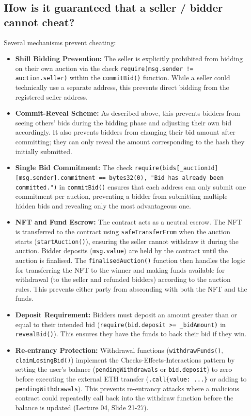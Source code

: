 \documentclass[11pt, a4paper]{article}
\begin{document}
\subsection{How is it guaranteed that a seller / bidder cannot cheat?}
Several mechanisms prevent cheating:
\begin{itemize}
    \item \textbf{Shill Bidding Prevention:} The seller is explicitly prohibited from bidding on their own auction via the check \texttt{require(msg.sender != auction.seller)} within the \texttt{commitBid()} function. While a seller could technically use a separate address, this prevents direct bidding from the registered seller address.
    \item \textbf{Commit-Reveal Scheme:} As described above, this prevents bidders from seeing others' bids during the bidding phase and adjusting their own bid accordingly. It also prevents bidders from changing their bid amount after committing; they can only reveal the amount corresponding to the hash they initially submitted.
    \item \textbf{Single Bid Commitment:} The check \texttt{require(bids[\_auctionId][msg.sender]\newline.commitment == bytes32(0), "Bid has already been committed.")} in \texttt{commitBid()} ensures that each address can only submit one commitment per auction, preventing a bidder from submitting multiple hidden bids and revealing only the most advantageous one.
    \item \textbf{NFT and Fund Escrow:} The contract acts as a neutral escrow. The NFT is transferred to the contract using \texttt{safeTransferFrom} when the auction starts (\texttt{startAuction()}), ensuring the seller cannot withdraw it during the auction. Bidder deposits (\texttt{msg.value}) are held by the contract until the auction is finalised. The \texttt{finalisedAuction()} function then handles the logic for transferring the NFT to the winner and making funds available for withdrawal (to the seller and refunded bidders) according to the auction rules. This prevents either party from absconding with both the NFT and the funds.
    \item \textbf{Deposit Requirement:} Bidders must deposit an amount greater than or equal to their intended bid (\texttt{require(bid.deposit >= \_bidAmount)} in \texttt{revealBid()}). This ensures they have the funds to back their bid if they win.
    \item \textbf{Re-entrancy Protection:} Withdrawal functions (\texttt{withdrawFunds()}, \texttt{claimLosingBid()}) implement the Checks-Effects-Interactions pattern by setting the user's balance \newline (\texttt{pendingWithdrawals} or \texttt{bid.deposit}) to zero before executing the external ETH transfer (\texttt{.call\{value: ...\}} or adding to \texttt{pendingWithdrawals}). This prevents re-entrancy attacks where a malicious contract could repeatedly call back into the withdraw function before the balance is updated (Lecture 04, Slide 21-27).
\end{itemize}
\end{document}
